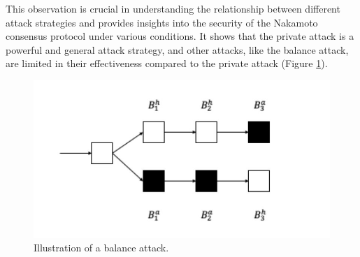 This observation is crucial in understanding the relationship between different attack strategies and provides insights into the security of the Nakamoto consensus protocol under various conditions. It shows that the private attack is a powerful and general attack strategy, and other attacks, like the balance attack, are limited in their effectiveness compared to the private attack (Figure \ref{fig:f3}). 
\begin{figure}[h!]
    \centering
    \includegraphics[width=0.6\linewidth]{Fig/06/F3}
    \caption{Illustration of a balance attack.}
    \label{fig:f3}
\end{figure}

